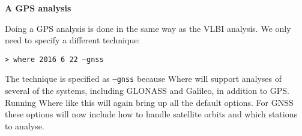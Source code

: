 {\bfseries A GPS analysis}

Doing a GPS analysis is done in the same way as the VLBI analysis. We only need
to specify a different technique:

\texttt{> where 2016 6 22 --gnss}

The technique is specified as \texttt{--gnss} because Where will support
analyses of several of the systems, including GLONASS and Galileo, in addition
to GPS. Running Where like this will again bring up all the default options. For
GNSS these options will now include how to handle satellite orbits and which
stations to analyse.


\endinput
